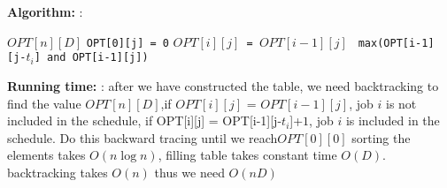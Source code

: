 \documentclass[11pt]{article}
\newcommand\algorithm{\vspace{.10in}\textbf{Algorithm: }}
\newcommand\runtime{\vspace{.10in}\textbf{Running time: }}
\begin{document}
\algorithm:
\begin{algorithmic}
\State $OPT[n][D]$
	\State \texttt{OPT[0][j] = 0}
\EndFor
{}
			\State \texttt{$OPT[i][j]$ = $OPT[i-1][j]$}
		\Else 
			\State \texttt{ max(OPT[i-1][j-\begin{math}t_i\end{math}] and OPT[i-1][j])}
		\EndIf
	\EndFor
\EndFor
\end{algorithmic}

\runtime:
after we have constructed the table, we need backtracking to find the value  $OPT[n][D]$,if $OPT[i][j]$ = $OPT[i-1][j]$,  job $i$ is not included in the schedule,
if OPT[i][j] = OPT[i-1][j-\begin{math}t_i\end{math}]+$1$, job $i$ is included in the schedule. Do this backward tracing until we reach$OPT[0][0]$ 
sorting the elements takes $O(n\log n)$, filling table takes constant time $O(D)$. backtracking takes $O(n)$
thus we need $O(nD)$
\end{document}
